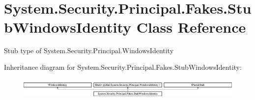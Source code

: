 \hypertarget{class_system_1_1_security_1_1_principal_1_1_fakes_1_1_stub_windows_identity}{\section{System.\-Security.\-Principal.\-Fakes.\-Stub\-Windows\-Identity Class Reference}
\label{class_system_1_1_security_1_1_principal_1_1_fakes_1_1_stub_windows_identity}
}


Stub type of System.\-Security.\-Principal.\-Windows\-Identity 


Inheritance diagram for System.\-Security.\-Principal.\-Fakes.\-Stub\-Windows\-Identity\-:\begin{figure}[H]
\begin{center}
\leavevmode
\includegraphics[height=1.069723cm]{class_system_1_1_security_1_1_principal_1_1_fakes_1_1_stub_windows_identity}
\end{center}
\end{figure}
